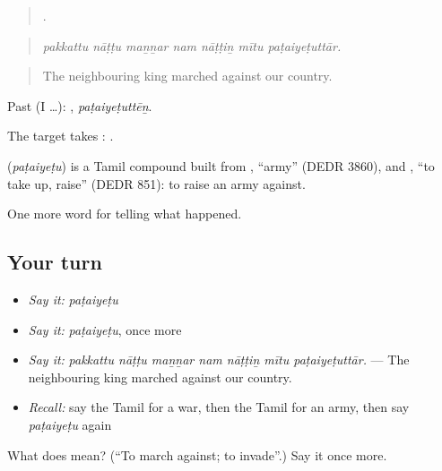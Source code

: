 \begin{quote}
      .
\end{quote}

\begin{quote}
\emph{pakkattu nāṭṭu maṉṉar nam nāṭṭiṉ mītu paṭaiyeṭuttār.}
\end{quote}

\begin{quote}
The neighbouring king marched against our country.
\end{quote}

Past (I …): , \emph{paṭaiyeṭuttēṉ}.

The target takes :   .

\begin{cousinweb}
\textbf{} (\emph{paṭaiyeṭu}) is a Tamil compound built from , \textquotedblleft{}army\textquotedblright{} (DEDR 3860), and , \textquotedblleft{}to take up, raise\textquotedblright{} (DEDR 851): to raise an army against.
\end{cousinweb}

\begin{grammarlens}[title={What you've built}]
One more word for telling what happened.
\end{grammarlens}

\subsection*{Your turn}
\begin{itemize}
\raggedright
  \item \emph{Say it:} \emph{paṭaiyeṭu}
  \item \emph{Say it:} \emph{paṭaiyeṭu}, once more
  \item \emph{Say it:} \emph{pakkattu nāṭṭu maṉṉar nam nāṭṭiṉ mītu paṭaiyeṭuttār.} — The neighbouring king marched against our country.
  \item \emph{Recall:} say the Tamil for a war, then the Tamil for an army, then say \emph{paṭaiyeṭu} again
\end{itemize}

\begin{tcolorbox}[breakable,colback=teal!4,colframe=teal!35!black,title={Before you move on}]
What does  mean? (\textquotedblleft{}To march against; to invade\textquotedblright{}.) Say it once more.
\end{tcolorbox}

